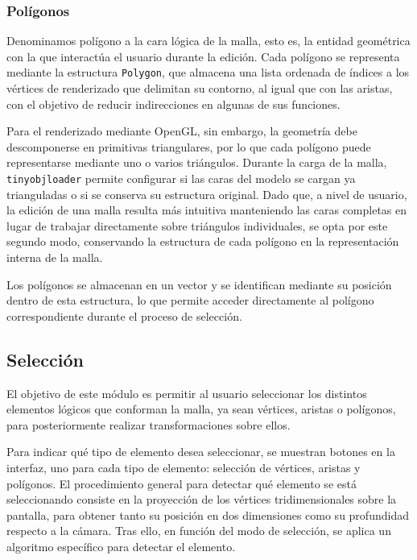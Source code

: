\subsubsection{Polígonos} \label{sec:poligonos}

Denominamos polígono a la cara lógica de la malla, esto es, la entidad geométrica con la que interactúa el usuario durante la edición. Cada polígono se representa mediante la estructura \texttt{Polygon}, que almacena una lista ordenada de índices a los vértices de renderizado que delimitan su contorno, al igual que con las aristas, con el objetivo de reducir indirecciones en algunas de sus funciones.

Para el renderizado mediante OpenGL, sin embargo, la geometría debe descomponerse en primitivas triangulares, por lo que cada polígono puede representarse mediante uno o varios triángulos. Durante la carga de la malla, \texttt{tinyobjloader} permite configurar si las caras del modelo se cargan ya trianguladas o si se conserva su estructura original. Dado que, a nivel de usuario, la edición de una malla resulta más intuitiva manteniendo las caras completas en lugar de trabajar directamente sobre triángulos individuales, se opta por este segundo modo, conservando la estructura de cada polígono en la representación interna de la malla.

Los polígonos se almacenan en un vector y se identifican mediante su posición dentro de esta estructura, lo que permite acceder directamente al polígono correspondiente durante el proceso de selección.

\subsection{Selección} \label{sec:seleccion}

El objetivo de este módulo es permitir al usuario seleccionar los distintos elementos lógicos que conforman la malla, ya sean vértices, aristas o polígonos, para posteriormente realizar transformaciones sobre ellos.

Para indicar qué tipo de elemento desea seleccionar, se muestran botones en la interfaz, uno para cada tipo de elemento: selección de vértices, aristas y polígonos. El procedimiento general para detectar qué elemento se está seleccionando consiste en la proyección de los vértices tridimensionales sobre la pantalla, para obtener tanto su posición en dos dimensiones como su profundidad respecto a la cámara. Tras ello, en función del modo de selección, se aplica un algoritmo específico para detectar el elemento.

